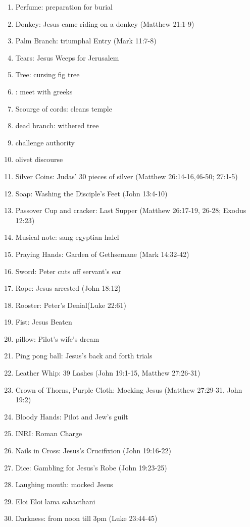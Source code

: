 \begin{enumerate}
\item
Perfume: preparation for burial
\item
Donkey: Jesus came riding on a donkey (Matthew 21:1-9)
\item
Palm Branch: triumphal Entry (Mark 11:7-8)
\item
Tears: Jesus Weeps for Jerusalem
\item
Tree: cursing fig tree
\item
: meet with greeks
\item
Scourge of cords: cleans temple
\item
dead branch: withered tree
\item
challenge authority
\item
olivet discourse
\item
Silver Coins: Judas' 30 pieces of silver (Matthew 26:14-16,46-50; 27:1-5)
\item
Soap: Washing the Disciple's Feet (John 13:4-10)
\item
Passover Cup and cracker: Last Supper (Matthew 26:17-19, 26-28; Exodus 12:23)
\item
Musical note: sang egyptian halel
\item
Praying Hands: Garden of Gethsemane (Mark 14:32-42)
\item
Sword: Peter cuts off servant's ear
\item
Rope: Jesus arrested (John 18:12)
\item
Rooster: Peter's Denial(Luke 22:61)
\item
Fist: Jesus Beaten
\item
pillow: Pilot's wife's dream
\item
Ping pong ball: Jesus's back and forth trials
\item
Leather Whip: 39 Lashes (John 19:1-15, Matthew 27:26-31)
\item
Crown of Thorns, Purple Cloth: Mocking Jesus (Matthew 27:29-31, John 19:2)
\item
Bloody Hands: Pilot and Jew's guilt
\item
INRI: Roman Charge
\item
Nails in Cross: Jesus's Crucifixion (John 19:16-22)
\item
Dice: Gambling for Jesus's Robe (John 19:23-25)
\item
Laughing mouth: mocked Jesus
\item
Eloi Eloi lama sabacthani
\item
Darkness: from noon till 3pm (Luke 23:44-45)

\end{enumerate}
